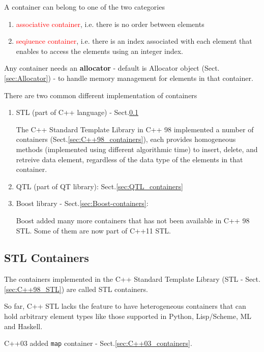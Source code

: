 A container can belong to one of the two categories
\begin{enumerate}
  \item \textcolor{red}{associative container}, i.e. there is no order between elements
  
  \item \textcolor{red}{seqiuence container}, i.e. there is an index associated with each element that enables to access
  the elements using an integer index.
\end{enumerate}

Any container needs an {\bf allocator} - default is Allocator object
(Sect.\ref{sec:Allocator}) - to handle memory management for elements in that
container.

There are two common different implementation of containers
\begin{enumerate}
  \item STL (part of C++ language) - Sect.\ref{sec:STL_containers}


The C++ Standard Template Library in C++ 98 implemented a number of containers
(Sect.\ref{sec:C++98_containers}), each provides homogeneous methods
(implemented using different algorithmic time) to insert, delete, and retreive
data element, regardless of the data type of the elements in that container.
  
  \item QTL (part of QT library): Sect.\ref{sec:QTL_containers}
  
  \item Boost library - Sect.\ref{sec:Boost-containers}: 
  
Boost added many more containers that has not been available in C++ 98 STL. Some of them are now part of C++11 STL.

\end{enumerate}

\subsection{STL Containers}
\label{sec:STL_containers}

The containers implemented in the C++ Standard Template Library (STL -
Sect.\ref{sec:C++98_STL}) are called STL containers.

So far, C++ STL lacks the feature to have heterogeneous containers that can hold
arbitrary element types like those supported in Python, Lisp/Scheme, ML and
Haskell.

C++03 added \verb!map! container - Sect.\ref{sec:C++03_containers}.

